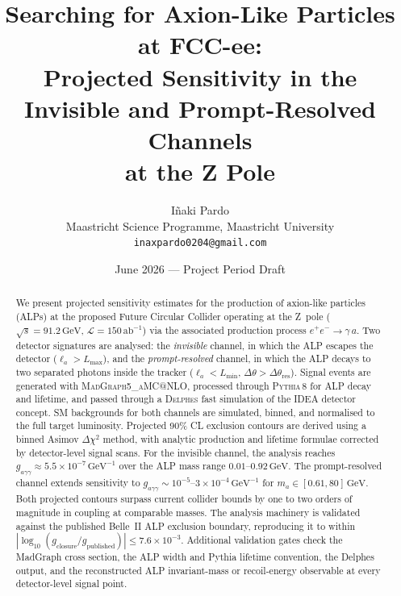 \documentclass[12pt,a4paper]{article}
\newcommand{\alp}{a}
\newcommand{\gagg}{g_{a\gamma\gamma}}
\newcommand{\Lint}{\mathcal{L}}
\newcommand{\sqrts}{\sqrt{s}}
\newcommand{\GeV}{\,\text{GeV}}
\newcommand{\abinv}{\,\text{ab}^{-1}}
\newcommand{\dchi}{\Delta\chi^2}
\begin{document}
\title{\textbf{Searching for Axion-Like Particles at FCC-ee:\\
    Projected Sensitivity in the Invisible and Prompt-Resolved Channels\\
    at the Z Pole}}

\author{Iñaki Pardo\\
    \small Maastricht Science Programme, Maastricht University\\
    \small \texttt{inaxpardo0204@gmail.com}}

\date{June 2026 — Project Period Draft}
\maketitle

\begin{abstract}
We present projected sensitivity estimates for the production of axion-like
particles (ALPs) at the proposed Future Circular Collider operating at the
Z~pole ($\sqrts = 91.2\GeV$, $\Lint = 150\abinv$) via the associated
production process $e^+e^- \to \gamma\,\alp$.
Two detector signatures are analysed: the \emph{invisible} channel, in which
the ALP escapes the detector ($\ell_\alp > L_\mathrm{max}$), and the
\emph{prompt-resolved} channel, in which the ALP decays to two separated
photons inside the tracker ($\ell_\alp < L_\mathrm{min}$,
$\Delta\theta > \Delta\theta_\mathrm{res}$).
Signal events are generated with \textsc{MadGraph5\_{aMC@NLO}}, processed
through \textsc{Pythia\,8} for ALP decay and lifetime, and passed through
a \textsc{Delphes} fast simulation of the IDEA detector concept.
SM backgrounds for both channels are simulated, binned, and normalised to the
full target luminosity.
Projected 90\% CL exclusion contours are derived using a binned
Asimov $\dchi$ method, with analytic production and lifetime formulae corrected
by detector-level signal scans.
For the invisible channel, the analysis reaches
$\gagg \approx 5.5\times10^{-7}\GeV^{-1}$ over the ALP mass range
$0.01\text{--}0.92\GeV$.
The prompt-resolved channel extends sensitivity to
$\gagg \sim 10^{-5}\text{--}3\times10^{-4}\GeV^{-1}$ for
$m_\alp \in [0.61, 80]\GeV$.
Both projected contours surpass current collider bounds by one to two orders
of magnitude in coupling at comparable masses.
The analysis machinery is validated against the published Belle~II
ALP exclusion boundary, reproducing it to within
$|\log_{10}(g_\mathrm{closure}/g_\mathrm{published})| \leq 7.6\times10^{-3}$.
Additional validation gates check the MadGraph cross section, the ALP width and
Pythia lifetime convention, the Delphes output, and the reconstructed ALP
invariant-mass or recoil-energy observable at every detector-level signal point.
\end{abstract}
\end{document}
